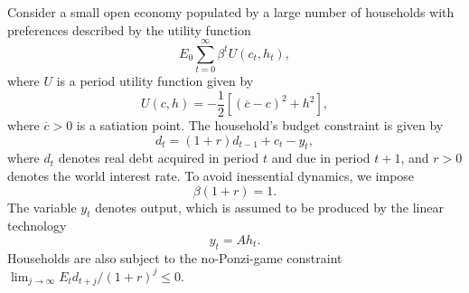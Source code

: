 \begin{exercise} \label{exercise:endowment_economy_labor}
Consider a small open economy populated by a large number of households with preferences described by the utility function
\[
E_0 \sum_{t=0}^{\infty}\beta^t U(c_t,h_t),
\]
where $U$ is a period utility function given by
\[
U(c,h) = -\frac12  \left[
(\overline{c}-c)^2+h^2
\right],
\]
where $\overline{c}>0$ is a satiation point. The household's budget constraint is given by
\[
d_t = (1+r) d_{t-1} + c_t  - y_t,
\]
where $d_t$ denotes real debt acquired in period $t$ and due in period $t+1$,  and $r>0$ denotes the world interest rate. To avoid inessential dynamics, we impose
\[\beta (1+r) =1.\]
The variable $y_t$ denotes output, which is assumed to be produced by the linear technology
\[y_t = A h_t. \]
Households are also subject to the no-Ponzi-game constraint $\lim_{j\rightarrow \infty} E_t
d_{t+j}/(1+r)^j\le 0.$


\end{exercise}
